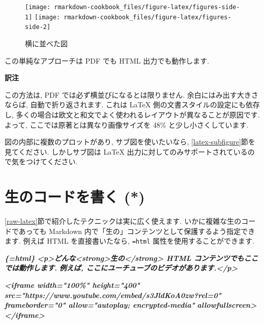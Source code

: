 \documentclass[
  11pt,
  lualatex,
  ja=standard]{bxjsreport}
\newenvironment{Shaded}{\begin{snugshade}}{\end{snugshade}}
\newcommand{\InformationTok}[1]{\textcolor[rgb]{0.56,0.35,0.01}{\textbf{\textit{#1}}}}
\newenvironment{infobox}[1]{\begin{itemize}\renewcommand{\labelitemi}{\raisebox{-.7\height}[0pt][0pt]{%
  {\setkeys{Gin}{width=3em,keepaspectratio}\texttt{[image: \_latex/\_img/\#1]}}}}
  \setlength{\fboxsep}{1em}
  \begin{greyblock}
  \item
  }{\end{greyblock}\end{itemize}
}
\begin{document}
\begin{figure}

{\centering \texttt{[image: rmarkdown-cookbook\_files/figure-latex/figures-side-1]} \texttt{[image: rmarkdown-cookbook\_files/figure-latex/figures-side-2]} 

}

\caption{横に並べた図}\label{fig:figures-side}
\end{figure}

この単純なアプローチは PDF でも HTML 出力でも動作します.

\begin{infobox}{memo}
\textbf{訳注}

この方法は, PDF では必ず横並びになるとは限りません. 余白にはみ出す大きさならば, 自動で折り返されます. これは LaTeX 側の文書スタイルの設定にも依存し, 多くの場合は欧文と和文でよく使われるレイアウトが異なることが原因です. よって, ここでは原著とは異なり画像サイズを 48\% と少し小さくしています.

\end{infobox}

図の内部に複数のプロットがあり, サブ図を使いたいなら, \ref{latex-subfigure}節を見てください. しかしサブ図は LaTeX 出力に対してのみサポートされているので気をつけてください.

\hypertarget{raw-content}{%
\section{生のコードを書く (*)}\label{raw-content}}

\ref{raw-latex}節で紹介したテクニックは実に広く使えます. いかに複雑な生のコードであっても Markdown 内で「生の」コンテンツとして保護するよう指定できます. 例えば HTML を直接書いたなら, \texttt{=html} 属性を使用することができます.

\begin{Shaded}
\begin{Highlighting}[]
\InformationTok{\textasciigrave{}\textasciigrave{}\textasciigrave{}\{=html\}}
\InformationTok{\textless{}p\textgreater{}どんな\textless{}strong\textgreater{}生の\textless{}/strong\textgreater{} HTML コンテンツでもここでは動作します.}
\InformationTok{例えば, ここにユーチューブのビデオがあります.\textless{}/p\textgreater{}}

\InformationTok{\textless{}iframe width="100\%" height="400"}
\InformationTok{  src="https://www.youtube.com/embed/s3JldKoA0zw?rel=0"}
\InformationTok{  frameborder="0" allow="autoplay; encrypted{-}media"}
\InformationTok{  allowfullscreen\textgreater{}\textless{}/iframe\textgreater{}}
\InformationTok{\textasciigrave{}\textasciigrave{}\textasciigrave{}}
\end{Highlighting}
\end{Shaded}
\end{document}
